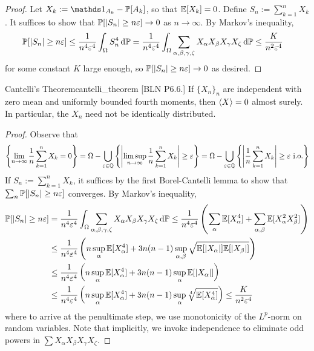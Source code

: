 \begin{proof}
    Let \(X_k := \ds{1}_{A_k} - \bb{P}[A_k]\), so that \(\mathbb{E}[X_k] = 0\). Define \(S_n := \sum_{k=1}^n X_k\). It suffices to show that \(\mathbb{P}[|S_n| \geq n \varepsilon] \to 0\) as \(n \to \infty\). By Markov's inequality, 
    \begin{align*}
        \mathbb{P}[|S_n| \geq n \varepsilon] 
        &\leq \frac{1}{n^4 \varepsilon^4} \int_{\Omega} S_n^4 \, \mathrm{d}\mathbb{P}
        = \frac{1}{n^4 \varepsilon^4} \int_\Omega \sum_{\alpha,\beta,\gamma,\zeta} X_\alpha X_\beta X_\gamma X_\zeta \, \mathrm{d}\mathbb{P}
        \leq \frac{K}{n^2 \varepsilon^4} 
    \end{align*}
    for some constant \(K\) large enough, so \(\mathbb{P}[|S_n| \geq n \varepsilon] \to 0\) as desired. 
\end{proof}


\begin{problem}{Cantelli's Theorem}{cantelli_theorem}
    [BLN P6.6.] If \(\{X_n\}_n\) are independent with zero mean and uniformly bounded fourth moments, then \(\ev{X} = 0\) almost surely. In particular, the \(X_n\) need not be identically distributed. 
\end{problem}

\begin{proof}
    Observe that 
    \[
        \left\{ \lim_{n \to \infty} \frac{1}{n} \sum_{k=1}^n X_k = 0 \right\}
        = \Omega - \bigcup_{\varepsilon \in \mathbb{Q}} \left\{ \left| \limsup_{n \to \infty} \frac{1}{n} \sum_{k=1}^n X_k \right| \geq \varepsilon \right\}
        = \Omega - \bigcup_{\varepsilon \in \mathbb{Q}} \left\{ \left| \frac{1}{n} \sum_{k=1}^n X_k \right| \geq \varepsilon \text{ i.o.} \right\}
    \]
    If \(S_n := \sum_{k=1}^n X_k\), it suffices by the first Borel-Cantelli lemma to show that \(\sum_n \mathbb{P}[|S_n| \geq n \varepsilon]\) converges. By Markov's inequality, 
    \begin{align*}
        \mathbb{P}[|S_n| \geq n \varepsilon] 
        &= \frac{1}{n^4 \varepsilon^4} \int_{\Omega} \sum_{\alpha, \beta, \gamma, \zeta} X_\alpha X_\beta X_\gamma X_\zeta \, \mathrm{d}\mathbb{P} 
        \leq \frac{1}{n^4 \varepsilon^4} \left(\sum_\alpha \mathbb{E}[X_\alpha^4] + \sum_{\alpha, \beta} \mathbb{E}[X_\alpha^2 X_\beta^2] \right) \\
        &\leq \frac{1}{n^4 \varepsilon^4} \left(n \sup_\alpha \mathbb{E}[X_\alpha^4] + 3n(n-1) \sup_{\alpha, \beta} \sqrt{\mathbb{E}[|X_\alpha|] \mathbb{E}[|X_\beta|]} \right) \\
        &\leq \frac{1}{n^4 \varepsilon^4} \left(n \sup_\alpha \mathbb{E}[X_\alpha^4] + 3n(n-1) \sup_\alpha \mathbb{E}[|X_\alpha|] \right) \\
        &\leq \frac{1}{n^4 \varepsilon^4} \left(n \sup_\alpha \mathbb{E}[X_\alpha^4] + 3n(n-1) \sup_\alpha \sqrt[4]{\mathbb{E}[X_\alpha^4]} \right) 
        \leq \frac{K}{n^2 \varepsilon^4}
    \end{align*}
    where to arrive at the penultimate step, we use monotonicity of the \(L^p\)-norm on random variables. Note that implicitly, we invoke independence to eliminate odd powers in \(\sum X_\alpha X_\beta X_\gamma X_\zeta\). 
\end{proof}


